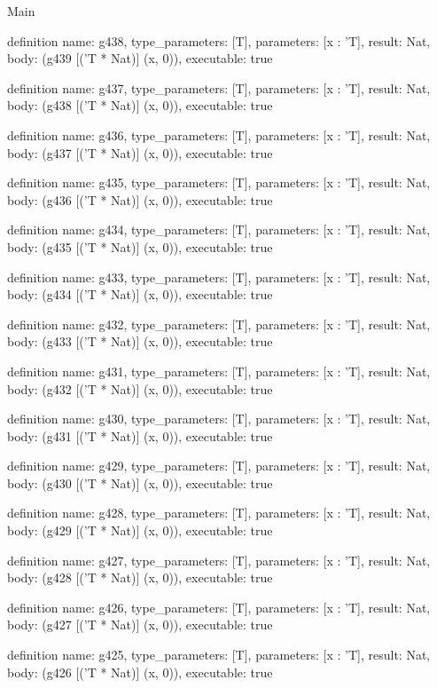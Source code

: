 \begin{lexlean}{Main}
\begin{semanticmodule}
definition{
  name: g438,
  type_parameters: [T],
  parameters: [x : 'T],
  result: Nat,
  body: (g439 [('T * Nat)] (x, 0)),
  executable: true
}

definition{
  name: g437,
  type_parameters: [T],
  parameters: [x : 'T],
  result: Nat,
  body: (g438 [('T * Nat)] (x, 0)),
  executable: true
}

definition{
  name: g436,
  type_parameters: [T],
  parameters: [x : 'T],
  result: Nat,
  body: (g437 [('T * Nat)] (x, 0)),
  executable: true
}

definition{
  name: g435,
  type_parameters: [T],
  parameters: [x : 'T],
  result: Nat,
  body: (g436 [('T * Nat)] (x, 0)),
  executable: true
}

definition{
  name: g434,
  type_parameters: [T],
  parameters: [x : 'T],
  result: Nat,
  body: (g435 [('T * Nat)] (x, 0)),
  executable: true
}

definition{
  name: g433,
  type_parameters: [T],
  parameters: [x : 'T],
  result: Nat,
  body: (g434 [('T * Nat)] (x, 0)),
  executable: true
}

definition{
  name: g432,
  type_parameters: [T],
  parameters: [x : 'T],
  result: Nat,
  body: (g433 [('T * Nat)] (x, 0)),
  executable: true
}

definition{
  name: g431,
  type_parameters: [T],
  parameters: [x : 'T],
  result: Nat,
  body: (g432 [('T * Nat)] (x, 0)),
  executable: true
}

definition{
  name: g430,
  type_parameters: [T],
  parameters: [x : 'T],
  result: Nat,
  body: (g431 [('T * Nat)] (x, 0)),
  executable: true
}

definition{
  name: g429,
  type_parameters: [T],
  parameters: [x : 'T],
  result: Nat,
  body: (g430 [('T * Nat)] (x, 0)),
  executable: true
}

definition{
  name: g428,
  type_parameters: [T],
  parameters: [x : 'T],
  result: Nat,
  body: (g429 [('T * Nat)] (x, 0)),
  executable: true
}

definition{
  name: g427,
  type_parameters: [T],
  parameters: [x : 'T],
  result: Nat,
  body: (g428 [('T * Nat)] (x, 0)),
  executable: true
}

definition{
  name: g426,
  type_parameters: [T],
  parameters: [x : 'T],
  result: Nat,
  body: (g427 [('T * Nat)] (x, 0)),
  executable: true
}

definition{
  name: g425,
  type_parameters: [T],
  parameters: [x : 'T],
  result: Nat,
  body: (g426 [('T * Nat)] (x, 0)),
  executable: true
}


\end{semanticmodule}
\end{lexlean}
